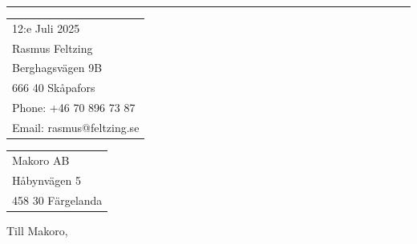 \documentclass{article}
\begin{document}


\vspace{-1em} %

\rule{\linewidth}{1pt} %

\bigskip\bigskip %


\hfill
\begin{tabular}{l @{}}
	12:e Juli 2025 \bigskip\\ %
	Rasmus Feltzing \\
	Berghagsvägen 9B \\ %
	666 40 Skåpafors \\
	Phone: +46 70 896 73 87 \\
	Email: rasmus@feltzing.se
\end{tabular}

\bigskip %


\begin{tabular}{@{} l}
	Makoro AB\\
	Håbynvägen 5\\
	458 30 Färgelanda
\end{tabular}

\bigskip %

Till Makoro,

\bigskip %


\end{document}
